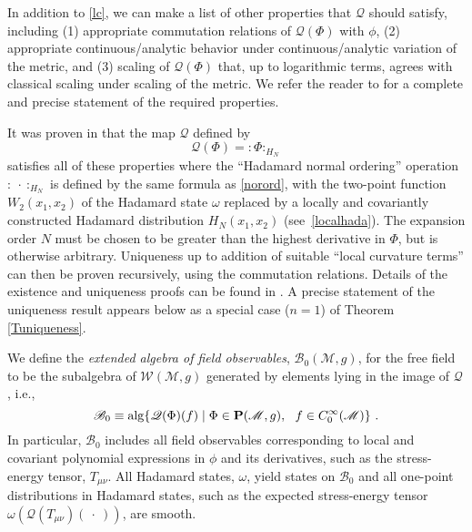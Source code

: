 \documentclass[12pt]{article}
\newcommand{\eB}{\mathscr{B}}
\newcommand{\eQ}{\mathscr{Q}}
\newcommand{\eW}{\mathscr{W}}
\newcommand{\M}{\mathscr{M}}
\renewcommand{\O}{\Phi}
\renewcommand{\P}{{\bf P}}
\theoremstyle{plain}
\theoremstyle{definition}
\def\ben{\begin{equation}}
\def\een{\end{equation}}
\begin{document}
In addition to \eqref{lc}, we can make a list of other properties that $\eQ$ should satisfy, including (1) appropriate commutation
relations of $\eQ(\O)$ with $\phi$, (2) appropriate continuous/analytic behavior under continuous/analytic variation of the metric, and (3) scaling of $\eQ(\O)$ that, up to logarithmic terms, agrees with classical scaling under scaling of the metric. We refer the reader to \cite{hw1} for a complete and precise statement of the required properties.

It was proven in \cite{hw1} that the map $\eQ$ defined by
\ben
\eQ(\O) = :\O:_{H_N}
\een
satisfies all of these properties
where the ``Hadamard normal ordering'' operation $: \ \cdot \ :_{H_N}$ is defined by the same formula as \eqref{norord}, with the two-point function $W_{2} (x_1, x_2)$ of the Hadamard state $\omega$ replaced by a locally and covariantly constructed Hadamard distribution $H_N(x_1, x_2)$ (see~\eqref{localhada}). The expansion order $N$ must be chosen to be greater
than the highest derivative in $\Phi$, but is otherwise arbitrary.
Uniqueness up to addition of suitable ``local curvature terms'' can then be proven recursively, using the commutation relations. Details of the existence and uniqueness proofs can be found in \cite{hw1}. A precise statement of the uniqueness result appears below as a special case ($n=1$) of Theorem \ref{Tuniqueness}.

We define the {\it extended algebra of field observables}, $\eB_0(\M,g)$, for the free field to be the subalgebra of
$\eW(\M,g)$ generated by elements lying in the image of $\eQ$, i.e.,
\ben\label{B0def}
\eB_0 \equiv {\rm alg} \{ \eQ(\O) (f) \mid \O \in \P(\M,g), \ \ f \in C^\infty_0(\M) \} \ .
\een
In particular, $\eB_0$ includes all field observables corresponding to local and covariant polynomial expressions in $\phi$ and its derivatives,
such as the stress-energy tensor, $T_{\mu\nu}$. All Hadamard states, $\omega$, yield states on $\eB_0$
and all one-point distributions in Hadamard states, such as the expected stress-energy tensor $\omega(\eQ(T_{\mu\nu})(\ \cdot \ ))$,
are smooth.
\end{document}
